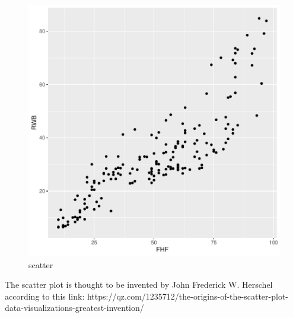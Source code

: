 \documentclass[11pt]{article}
\begin{document}
\begin{figure}[h]
\centering
\begin{adjustbox}{width=7cm,height=5.5cm}
\includegraphics{PaperInR_5-numnum_plot}
\end{adjustbox}
\caption{scatter}  
\label{numnum_plot} 
\end{figure}


The scatter plot is thought to be invented by  John Frederick W. Herschel according to this link: https://qz.com/1235712/the-origins-of-the-scatter-plot-data-visualizations-greatest-invention/
\end{document}
